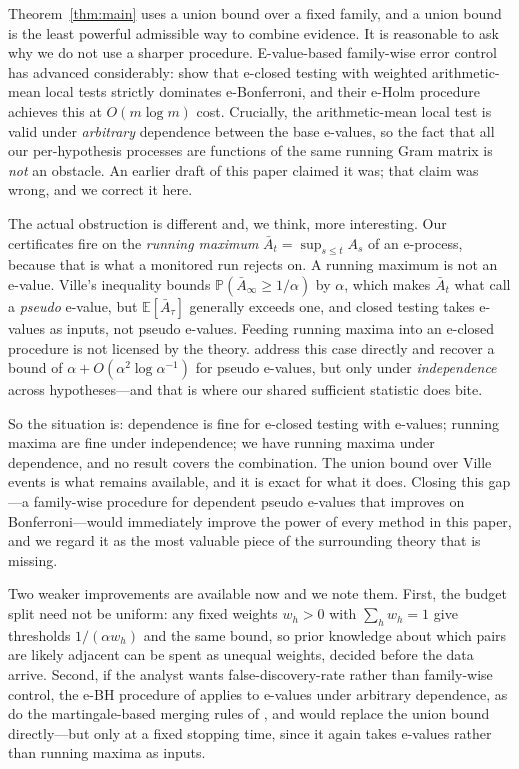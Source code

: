 \documentclass[pdflatex,sn-apa]{sn-jnl}
\theoremstyle{thmstyleone}%
\theoremstyle{thmstyletwo}%
\theoremstyle{thmstylethree}%
\newcommand{\Prob}{\mathbb{P}}
\newcommand{\Exp}{\mathbb{E}}
\begin{document}
Theorem~\ref{thm:main} uses a union bound over a fixed family, and a union
bound is the least powerful admissible way to combine evidence. It is
reasonable to ask why we do not use a sharper procedure. E-value-based
family-wise error control has advanced considerably: \citet{hartog2026fwer}
show that e-closed testing with weighted arithmetic-mean local tests strictly
dominates e-Bonferroni, and their e-Holm procedure achieves this at $O(m \log
m)$ cost. Crucially, the arithmetic-mean local test is valid under
\emph{arbitrary} dependence between the base e-values, so the fact that all
our per-hypothesis processes are functions of the same running Gram matrix is
\emph{not} an obstacle. An earlier draft of this paper claimed it was; that
claim was wrong, and we correct it here.

The actual obstruction is different and, we think, more interesting. Our
certificates fire on the \emph{running maximum} $\bar A_t = \sup_{s \le t}
A_s$ of an e-process, because that is what a monitored run rejects on. A
running maximum is not an e-value. Ville's inequality bounds
$\Prob(\bar A_\infty \ge 1/\alpha)$ by $\alpha$, which makes $\bar A_t$ what
\citet{hartog2026fwer} call a \emph{pseudo} e-value, but $\Exp[\bar A_\tau]$
generally exceeds one, and closed testing takes e-values as inputs, not
pseudo e-values. Feeding running maxima into an e-closed procedure is not
licensed by the theory. \citet{hartog2026fwer} address this case directly and
recover a bound of $\alpha + O(\alpha^2 \log \alpha^{-1})$ for pseudo
e-values, but only under \emph{independence} across hypotheses---and that is
where our shared sufficient statistic does bite.

So the situation is: dependence is fine for e-closed testing with e-values;
running maxima are fine under independence; we have running maxima under
dependence, and no result covers the combination. The union bound over Ville
events is what remains available, and it is exact for what it does. Closing
this gap---a family-wise procedure for dependent pseudo e-values that improves
on Bonferroni---would immediately improve the power of every method in this
paper, and we regard it as the most valuable piece of the surrounding theory
that is missing.

Two weaker improvements are available now and we note them. First, the budget
split need not be uniform: any fixed weights $w_h > 0$ with $\sum_h w_h = 1$
give thresholds $1/(\alpha w_h)$ and the same bound, so prior knowledge about
which pairs are likely adjacent can be spent as unequal weights, decided
before the data arrive. Second, if the analyst wants false-discovery-rate
rather than family-wise control, the e-BH procedure of
\citet{wang2022false} applies to e-values under arbitrary dependence, as do
the martingale-based merging rules of \citet{vovk2024merging}, and would
replace the union bound directly---but only at a fixed stopping time, since it
again takes e-values rather than running maxima as inputs.
\end{document}
